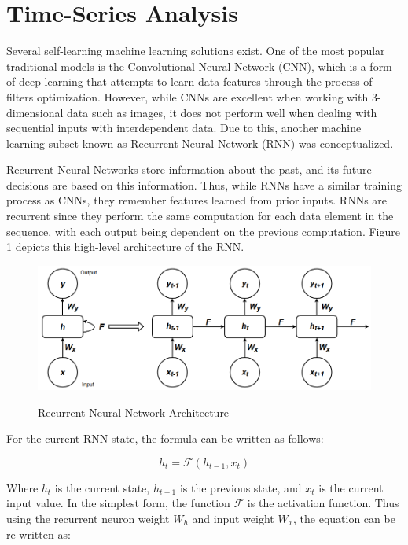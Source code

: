 \section{Time-Series Analysis}
\label{sec:ch2-time-series}

Several self-learning machine learning solutions exist. One of the most popular traditional models is the Convolutional Neural Network (CNN), which is a form of deep learning that attempts to learn data features through the process of filters optimization. However, while CNNs are excellent when working with 3-dimensional data such as images, it does not perform well when dealing with sequential inputs with interdependent data. Due to this, another machine learning subset known as Recurrent Neural Network (RNN) was conceptualized. \par

Recurrent Neural Networks store information about the past, and its future decisions are based on this information. Thus, while RNNs have a similar training process as CNNs, they remember features learned from prior inputs. RNNs are recurrent since they perform the same computation for each data element in the sequence, with each output being dependent on the previous computation. Figure \ref{fig:rnn-architecture} depicts this high-level architecture of the RNN.\par

\begin{figure}[htb]
    \centering
    \caption{Recurrent Neural Network Architecture}
    \includegraphics[width=1.0\linewidth]{Figures/RNN-Overview.png}
    \label{fig:rnn-architecture}
\end{figure}

For the current RNN state, the formula can be written as follows:

\begin{equation}
    h_{t} = \mathcal{F}(h_{t-1}, x_{t})
\end{equation}

Where $h_{t}$ is the current state, $h_{t-1}$ is the previous state, and $x_{t}$ is the current input value. In the simplest form, the function $\mathcal{F}$ is the activation function. Thus using the recurrent neuron weight $W_{h}$ and input weight $W_{x}$, the equation can be re-written as:

